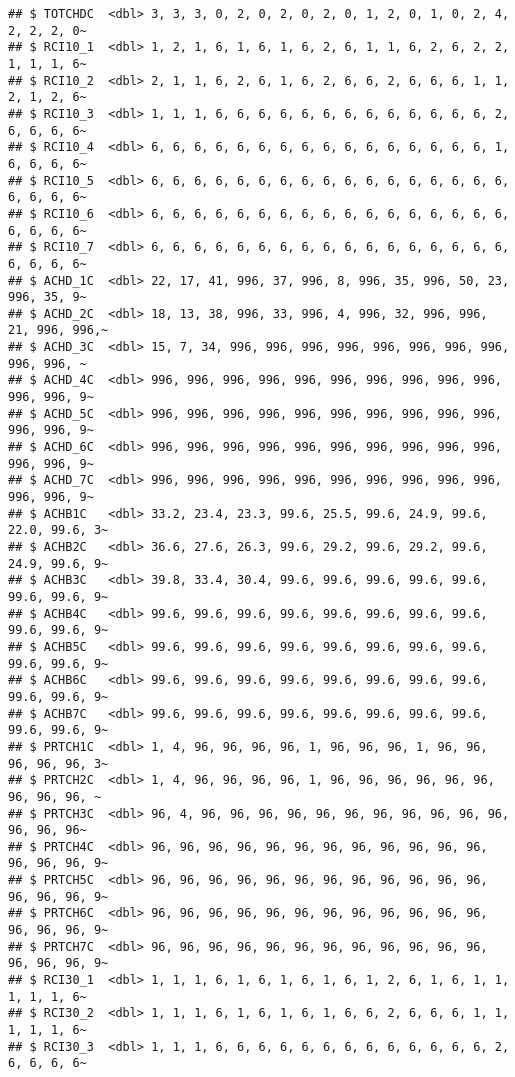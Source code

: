 \documentclass[
]{article}
\begin{document}
\begin{verbatim}
## $ TOTCHDC  <dbl> 3, 3, 3, 0, 2, 0, 2, 0, 2, 0, 1, 2, 0, 1, 0, 2, 4, 2, 2, 2, 0~
## $ RCI10_1  <dbl> 1, 2, 1, 6, 1, 6, 1, 6, 2, 6, 1, 1, 6, 2, 6, 2, 2, 1, 1, 1, 6~
## $ RCI10_2  <dbl> 2, 1, 1, 6, 2, 6, 1, 6, 2, 6, 6, 2, 6, 6, 6, 1, 1, 2, 1, 2, 6~
## $ RCI10_3  <dbl> 1, 1, 1, 6, 6, 6, 6, 6, 6, 6, 6, 6, 6, 6, 6, 6, 2, 6, 6, 6, 6~
## $ RCI10_4  <dbl> 6, 6, 6, 6, 6, 6, 6, 6, 6, 6, 6, 6, 6, 6, 6, 6, 1, 6, 6, 6, 6~
## $ RCI10_5  <dbl> 6, 6, 6, 6, 6, 6, 6, 6, 6, 6, 6, 6, 6, 6, 6, 6, 6, 6, 6, 6, 6~
## $ RCI10_6  <dbl> 6, 6, 6, 6, 6, 6, 6, 6, 6, 6, 6, 6, 6, 6, 6, 6, 6, 6, 6, 6, 6~
## $ RCI10_7  <dbl> 6, 6, 6, 6, 6, 6, 6, 6, 6, 6, 6, 6, 6, 6, 6, 6, 6, 6, 6, 6, 6~
## $ ACHD_1C  <dbl> 22, 17, 41, 996, 37, 996, 8, 996, 35, 996, 50, 23, 996, 35, 9~
## $ ACHD_2C  <dbl> 18, 13, 38, 996, 33, 996, 4, 996, 32, 996, 996, 21, 996, 996,~
## $ ACHD_3C  <dbl> 15, 7, 34, 996, 996, 996, 996, 996, 996, 996, 996, 996, 996, ~
## $ ACHD_4C  <dbl> 996, 996, 996, 996, 996, 996, 996, 996, 996, 996, 996, 996, 9~
## $ ACHD_5C  <dbl> 996, 996, 996, 996, 996, 996, 996, 996, 996, 996, 996, 996, 9~
## $ ACHD_6C  <dbl> 996, 996, 996, 996, 996, 996, 996, 996, 996, 996, 996, 996, 9~
## $ ACHD_7C  <dbl> 996, 996, 996, 996, 996, 996, 996, 996, 996, 996, 996, 996, 9~
## $ ACHB1C   <dbl> 33.2, 23.4, 23.3, 99.6, 25.5, 99.6, 24.9, 99.6, 22.0, 99.6, 3~
## $ ACHB2C   <dbl> 36.6, 27.6, 26.3, 99.6, 29.2, 99.6, 29.2, 99.6, 24.9, 99.6, 9~
## $ ACHB3C   <dbl> 39.8, 33.4, 30.4, 99.6, 99.6, 99.6, 99.6, 99.6, 99.6, 99.6, 9~
## $ ACHB4C   <dbl> 99.6, 99.6, 99.6, 99.6, 99.6, 99.6, 99.6, 99.6, 99.6, 99.6, 9~
## $ ACHB5C   <dbl> 99.6, 99.6, 99.6, 99.6, 99.6, 99.6, 99.6, 99.6, 99.6, 99.6, 9~
## $ ACHB6C   <dbl> 99.6, 99.6, 99.6, 99.6, 99.6, 99.6, 99.6, 99.6, 99.6, 99.6, 9~
## $ ACHB7C   <dbl> 99.6, 99.6, 99.6, 99.6, 99.6, 99.6, 99.6, 99.6, 99.6, 99.6, 9~
## $ PRTCH1C  <dbl> 1, 4, 96, 96, 96, 96, 1, 96, 96, 96, 1, 96, 96, 96, 96, 96, 3~
## $ PRTCH2C  <dbl> 1, 4, 96, 96, 96, 96, 1, 96, 96, 96, 96, 96, 96, 96, 96, 96, ~
## $ PRTCH3C  <dbl> 96, 4, 96, 96, 96, 96, 96, 96, 96, 96, 96, 96, 96, 96, 96, 96~
## $ PRTCH4C  <dbl> 96, 96, 96, 96, 96, 96, 96, 96, 96, 96, 96, 96, 96, 96, 96, 9~
## $ PRTCH5C  <dbl> 96, 96, 96, 96, 96, 96, 96, 96, 96, 96, 96, 96, 96, 96, 96, 9~
## $ PRTCH6C  <dbl> 96, 96, 96, 96, 96, 96, 96, 96, 96, 96, 96, 96, 96, 96, 96, 9~
## $ PRTCH7C  <dbl> 96, 96, 96, 96, 96, 96, 96, 96, 96, 96, 96, 96, 96, 96, 96, 9~
## $ RCI30_1  <dbl> 1, 1, 1, 6, 1, 6, 1, 6, 1, 6, 1, 2, 6, 1, 6, 1, 1, 1, 1, 1, 6~
## $ RCI30_2  <dbl> 1, 1, 1, 6, 1, 6, 1, 6, 1, 6, 6, 2, 6, 6, 6, 1, 1, 1, 1, 1, 6~
## $ RCI30_3  <dbl> 1, 1, 1, 6, 6, 6, 6, 6, 6, 6, 6, 6, 6, 6, 6, 6, 2, 6, 6, 6, 6~

\end{verbatim}
\end{document}
